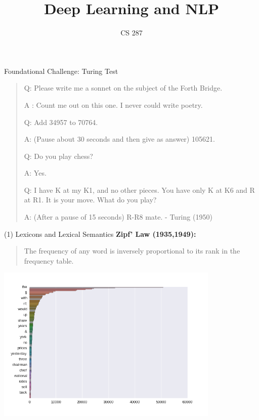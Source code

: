 \documentclass{beamer}
\title{Deep Learning and NLP}
\date{}
\author{CS 287}
\begin{document}
\begin{frame}
  \titlepage
\end{frame}


\begin{frame}{Foundational Challenge: Turing Test}
  \begin{quote}
    Q: Please write me a sonnet on the subject of the Forth Bridge.

    A : Count me out on this one. I never could write poetry.

    Q: Add 34957 to 70764.
    
    A: (Pause about 30 seconds and then give as answer) 105621.
    
    Q: Do you play chess?
    
    A: Yes.
    
    Q: I have K at my K1, and no other pieces. You have only K at K6 and R at R1. It is your move. What do you play?

    A: (After a pause of 15 seconds) R-R8 mate.
      {\normalfont - Turing (1950)}
  \end{quote}

\end{frame}

\begin{frame}{(1) Lexicons and Lexical Semantics}
  \textbf{Zipf' Law (1935,1949):}
  \begin{quote}
    The frequency of any word is inversely proportional to its rank in the frequency table.
  \end{quote}


     \begin{center}
       \includegraphics[width=0.8\textwidth]{../notebooks/zipf}         
     \end{center}
\end{frame}
\end{document}
